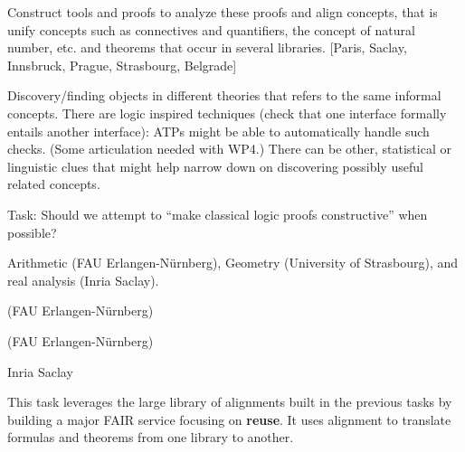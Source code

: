 \begin{workpackage}[id=alignment,wphases=0-48,type=RTD,
  short=Concept Alignment,%
  title=Concept Alignment,
  lead=Pra,
  PraRM=10]
\begin{wpdescription}
Construct tools and proofs to analyze these proofs and align concepts, that is unify
concepts such as connectives and quantifiers, the concept of natural number, etc. and
theorems that occur in several libraries.  [Paris, Saclay, Innsbruck, Prague,
Strasbourg, Belgrade]

Discovery/finding objects in different theories that refers to the
same informal concepts.
There are logic inspired techniques (check that one interface formally
entails another interface): ATPs might be able to automatically handle
such checks. (Some articulation needed with WP4.)
There can be other, statistical or linguistic clues that might help
narrow down on discovering possibly useful related concepts.

\end{wpdescription}

Task: Should we attempt to ``make classical logic proofs constructive'' when possible?

\begin{tasklist}
\begin{task}[id=aligndef,title=Tracking classical and intuitionistic proof steps in logic and arithmetic] 
\end{task}

\begin{task}[id=aligndef,title=Alignment in particular domains]
  Arithmetic (FAU Erlangen-Nürnberg), Geometry (University of
  Strasbourg), and real analysis (Inria Saclay).
\end{task}

\begin{task}[id=aligndef,title=Definition of an Alignment Language]
(FAU Erlangen-Nürnberg)
\end{task}

\begin{task}[id=translate,title=Libraries as intermediates for translations]
(FAU Erlangen-Nürnberg)
\end{task}

\begin{task}[id=translate,title=Alignment of proof structures]
Inria Saclay
\end{task}

\begin{task}[id=aligntranslate,title=FAIR Services: Reuse across Libraries,lead=Fau,FauRM=12]
This task leverages the large library of alignments built in the previous tasks by building a major FAIR service focusing on \textbf{reuse}.
It uses alignment to translate formulas and theorems from one library to another.
\end{task}


\end{tasklist}
\end{workpackage}
